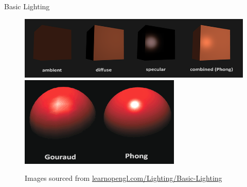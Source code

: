 \documentclass{beamer}
\begin{document}
\begin{frame}[fragile]{Basic Lighting}
    \begin{figure}
        \centering
        \includegraphics[height=0.30\textheight]{images/basic_lighting_phong.png}
        \includegraphics[height=0.30\textheight]{images/basic_lighting_gouruad.png}
        \caption{\footnotesize{Images sourced from \url{learnopengl.com/Lighting/Basic-Lighting}}}
    \end{figure}
\end{frame}
\end{document}
